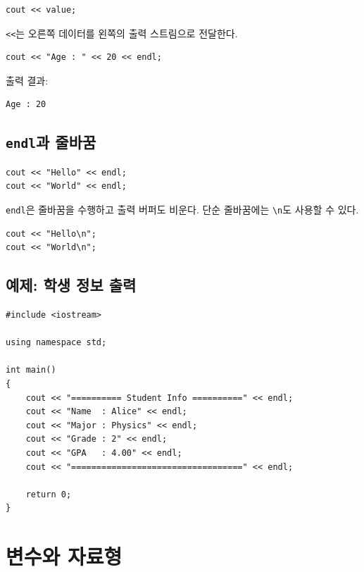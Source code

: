 \documentclass[11pt,a4paper]{article}
\begin{document}
\begin{lstlisting}
cout << value;
\end{lstlisting}

\texttt{<<}는 오른쪽 데이터를 왼쪽의 출력 스트림으로 전달한다.

\begin{lstlisting}
cout << "Age : " << 20 << endl;
\end{lstlisting}

출력 결과:

\begin{verbatim}
Age : 20
\end{verbatim}

\subsection{\texttt{endl}과 줄바꿈}

\begin{lstlisting}
cout << "Hello" << endl;
cout << "World" << endl;
\end{lstlisting}

\texttt{endl}은 줄바꿈을 수행하고 출력 버퍼도 비운다.
단순 줄바꿈에는 \texttt{\textbackslash n}도 사용할 수 있다.

\begin{lstlisting}
cout << "Hello\n";
cout << "World\n";
\end{lstlisting}

\subsection{예제: 학생 정보 출력}

\begin{lstlisting}
#include <iostream>

using namespace std;

int main()
{
    cout << "========== Student Info ==========" << endl;
    cout << "Name  : Alice" << endl;
    cout << "Major : Physics" << endl;
    cout << "Grade : 2" << endl;
    cout << "GPA   : 4.00" << endl;
    cout << "==================================" << endl;

    return 0;
}
\end{lstlisting}

\section{변수와 자료형}
\end{document}
